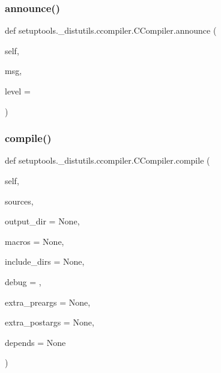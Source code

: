 \subsubsection{\texorpdfstring{announce()}{announce()}}
{\footnotesize\ttfamily def setuptools.\+\_\+distutils.\+ccompiler.\+C\+Compiler.\+announce (\begin{DoxyParamCaption}\item[{}]{self,  }\item[{}]{msg,  }\item[{}]{level = {} }\end{DoxyParamCaption})}

\mbox{\label{classsetuptools_1_1__distutils_1_1ccompiler_1_1CCompiler_a7833583eb8aad3b9be525a98b9293fa5}} 
\subsubsection{\texorpdfstring{compile()}{compile()}}
{\footnotesize\ttfamily def setuptools.\+\_\+distutils.\+ccompiler.\+C\+Compiler.\+compile (\begin{DoxyParamCaption}\item[{}]{self,  }\item[{}]{sources,  }\item[{}]{output\+\_\+dir = {\ttfamily None},  }\item[{}]{macros = {\ttfamily None},  }\item[{}]{include\+\_\+dirs = {\ttfamily None},  }\item[{}]{debug = {},  }\item[{}]{extra\+\_\+preargs = {\ttfamily None},  }\item[{}]{extra\+\_\+postargs = {\ttfamily None},  }\item[{}]{depends = {\ttfamily None} }\end{DoxyParamCaption})}

